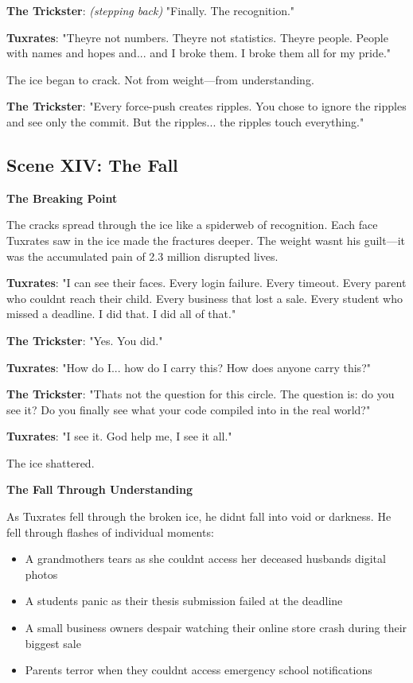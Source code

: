 \textbf{The Trickster}: \emph{(stepping back)} "Finally. The recognition."

\textbf{Tuxrates}: "They\textquotesingle re not numbers. They\textquotesingle re not statistics. They\textquotesingle re people. People with names and hopes and... and I broke them. I broke them all for my pride."

The ice began to crack. Not from weight---from understanding.

\textbf{The Trickster}: "Every force-push creates ripples. You chose to ignore the ripples and see only the commit. But the ripples... the ripples touch everything."

\bookdivider

\subsection{Scene XIV: The Fall}\label{scene-xiv-the-fall}

\textbf{The Breaking Point}

The cracks spread through the ice like a spiderweb of recognition. Each face Tuxrates saw in the ice made the fractures deeper. The weight wasn\textquotesingle t his guilt---it was the accumulated pain of 2.3 million disrupted lives.

\textbf{Tuxrates}: "I can see their faces. Every login failure. Every timeout. Every parent who couldn\textquotesingle t reach their child. Every business that lost a sale. Every student who missed a deadline. I did that. I did all of that."

\textbf{The Trickster}: "Yes. You did."

\textbf{Tuxrates}: "How do I... how do I carry this? How does anyone carry this?"

\textbf{The Trickster}: "That\textquotesingle s not the question for this circle. The question is: do you see it? Do you finally see what your code compiled into in the real world?"

\textbf{Tuxrates}: "I see it. God help me, I see it all."

The ice shattered.

\textbf{The Fall Through Understanding}

As Tuxrates fell through the broken ice, he didn\textquotesingle t fall into void or darkness. He fell through flashes of individual moments:

\begin{itemize}
\tightlist
\item
  A grandmother\textquotesingle s tears as she couldn\textquotesingle t access her deceased husband\textquotesingle s digital photos
\item
  A student\textquotesingle s panic as their thesis submission failed at the deadline
\item
  A small business owner\textquotesingle s despair watching their online store crash during their biggest sale
\item
  Parents\textquotesingle{} terror when they couldn\textquotesingle t access emergency school notifications
\end{itemize}

